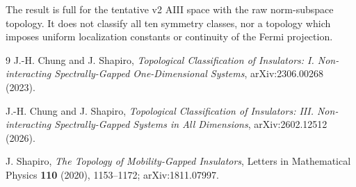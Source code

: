 \documentclass[11pt]{article}
\begin{document}
The result is full for the tentative v2 AIII space with the raw norm-subspace
topology.  It does not classify all ten symmetry classes, nor a topology
which imposes uniform localization constants or continuity of the Fermi
projection.

\begin{thebibliography}{9}
J.-H. Chung and J. Shapiro,
\emph{Topological Classification of Insulators: I. Non-interacting
Spectrally-Gapped One-Dimensional Systems},
arXiv:2306.00268 (2023).

J.-H. Chung and J. Shapiro,
\emph{Topological Classification of Insulators: III. Non-interacting
Spectrally-Gapped Systems in All Dimensions},
arXiv:2602.12512 (2026).

J. Shapiro,
\emph{The Topology of Mobility-Gapped Insulators},
Letters in Mathematical Physics \textbf{110} (2020), 1153--1172;
arXiv:1811.07997.
\end{thebibliography}
\end{document}
